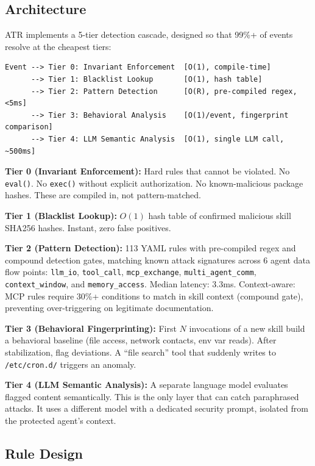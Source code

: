 \documentclass[11pt,letterpaper]{article}
\begin{document}
\subsection{Architecture}

ATR implements a 5-tier detection cascade, designed so that 99\%+ of events resolve at the cheapest tiers:

\begin{lstlisting}
Event --> Tier 0: Invariant Enforcement  [O(1), compile-time]
      --> Tier 1: Blacklist Lookup       [O(1), hash table]
      --> Tier 2: Pattern Detection      [O(R), pre-compiled regex, <5ms]
      --> Tier 3: Behavioral Analysis    [O(1)/event, fingerprint comparison]
      --> Tier 4: LLM Semantic Analysis  [O(1), single LLM call, ~500ms]
\end{lstlisting}

\textbf{Tier 0 (Invariant Enforcement):} Hard rules that cannot be violated. No \texttt{eval()}. No \texttt{exec()} without explicit authorization. No known-malicious package hashes. These are compiled in, not pattern-matched.

\textbf{Tier 1 (Blacklist Lookup):} $O(1)$ hash table of confirmed malicious skill SHA256 hashes. Instant, zero false positives.

\textbf{Tier 2 (Pattern Detection):} 113 YAML rules with pre-compiled regex and compound detection gates, matching known attack signatures across 6 agent data flow points: \texttt{llm\_io}, \texttt{tool\_call}, \texttt{mcp\_exchange}, \texttt{multi\_agent\_comm}, \texttt{context\_window}, and \texttt{memory\_access}. Median latency: 3.3ms. Context-aware: MCP rules require 30\%+ conditions to match in skill context (compound gate), preventing over-triggering on legitimate documentation.

\textbf{Tier 3 (Behavioral Fingerprinting):} First $N$ invocations of a new skill build a behavioral baseline (file access, network contacts, env var reads). After stabilization, flag deviations. A ``file search'' tool that suddenly writes to \texttt{/etc/cron.d/} triggers an anomaly.

\textbf{Tier 4 (LLM Semantic Analysis):} A separate language model evaluates flagged content semantically. This is the only layer that can catch paraphrased attacks. It uses a different model with a dedicated security prompt, isolated from the protected agent's context.

\subsection{Rule Design}
\end{document}
